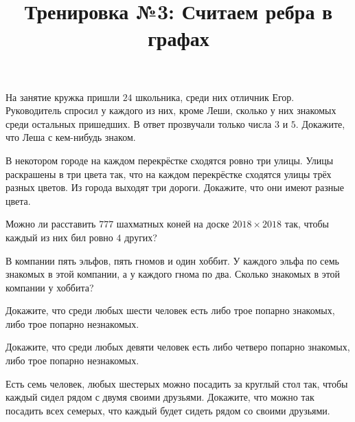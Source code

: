 



\title{Тренировка №3: Считаем ребра в графах}
\maketitle

\begin{problem}
	На занятие кружка пришли $24$ школьника, среди них отличник Егор. Руководитель спросил у каждого из них, кроме Леши, сколько у них знакомых среди остальных пришедших. В ответ прозвучали только числа $3$ и $5$. Докажите, что Леша с кем-нибудь знаком.
\end{problem}

\begin{problem}
	В некотором городе на каждом перекрёстке сходятся ровно три улицы. Улицы раскрашены в три цвета так, что на каждом перекрёстке сходятся улицы трёх разных цветов. Из города выходят три дороги. Докажите, что они имеют разные цвета.
\end{problem}

\begin{problem}
	Можно ли расставить $777$ шахматных коней на доске $2018 \times 2018$ так, чтобы каждый из них бил ровно $4$ других?
\end{problem}

\begin{problem}
	В компании пять эльфов, пять гномов и один хоббит. У каждого эльфа по семь знакомых в этой компании, а у каждого гнома по два. Сколько знакомых в этой компании у хоббита?
\end{problem}

\begin{problem}
	Докажите, что среди любых шести человек есть либо трое попарно знакомых, либо трое попарно незнакомых.
\end{problem}

\begin{problem}
	Докажите, что среди любых девяти человек есть либо четверо попарно знакомых, либо трое попарно незнакомых.
\end{problem}

\begin{problem}
	Есть семь человек, любых шестерых можно посадить за круглый стол так, чтобы каждый сидел рядом с двумя своими друзьями. Докажите, что можно так посадить всех семерых, что каждый будет сидеть рядом со своими друзьями.
\end{problem}

